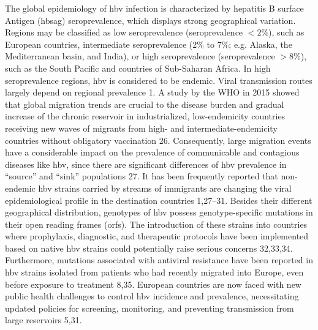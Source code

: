 The global epidemiology of \gls{hbv} infection is characterized by hepatitis B surface Antigen (\gls{hbsag}) seroprevalence, which displays strong geographical variation.
Regions may be classified as low seroprevalence (seroprevalence $< 2\%$), such as European countries, intermediate seroprevalence ($2\%$ to $7\%$; e.g. Alaska, the Mediterranean basin, and India), or high seroprevalence (seroprevalence $> 8\%$), such as the South Pacific and countries of Sub-Saharan Africa.
In high seroprevalence regions, \gls{hbv} is considered to be endemic.
Viral transmission routes largely depend on regional prevalence 1.
A study by the WHO in 2015 showed that global migration trends are crucial to the disease burden and gradual increase of the chronic reservoir in industrialized, low-endemicity countries receiving new waves of migrants from high- and intermediate-endemicity countries without obligatory vaccination 26.
Consequently, large migration events have a considerable impact on the prevalence of communicable and contagious diseases like \gls{hbv}, since there are significant differences of \gls{hbv} prevalence in ``source'' and ``sink'' populations 27.
It has been frequently reported that non-endemic \gls{hbv} strains carried by streams of immigrants are changing the viral epidemiological profile in the destination countries 1,27–31.
Besides their different geographical distribution, genotypes of \gls{hbv} possess genotype-specific mutations in their open reading frames (\gls{orf}s).
The introduction of these strains into countries where prophylaxis, diagnostic, and therapeutic protocols have been implemented based on native \gls{hbv} strains could potentially raise serious concerns 32,33,34.
Furthermore, mutations associated with antiviral resistance have been reported in \gls{hbv} strains isolated from patients who had recently migrated into Europe, even before exposure to treatment 8,35.
European countries are now faced with new public health challenges to control \gls{hbv} incidence and prevalence, necessitating updated policies for screening, monitoring, and preventing transmission from large reservoirs 5,31.\\

